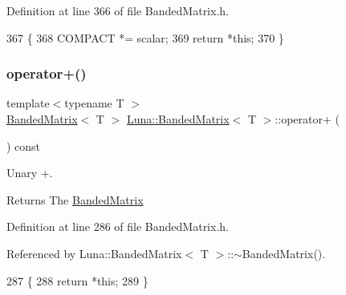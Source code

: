 Definition at line 366 of file Banded\+Matrix.\+h.


\begin{DoxyCode}
367   \{
368     COMPACT *= scalar;
369     \textcolor{keywordflow}{return} *\textcolor{keyword}{this};
370   \}
\end{DoxyCode}
\mbox{\label{classLuna_1_1BandedMatrix_a76611984fef082ce06e307fea390dc86}} 
\subsubsection{\texorpdfstring{operator+()}{operator+()}\hspace{0.1cm}{\footnotesize\ttfamily [1/2]}}
{\footnotesize\ttfamily template$<$typename T $>$ \\
\hyperlink{classLuna_1_1BandedMatrix}{Banded\+Matrix}$<$ T $>$ \hyperlink{classLuna_1_1BandedMatrix}{Luna\+::\+Banded\+Matrix}$<$ T $>$\+::operator+ (\begin{DoxyParamCaption}{ }\end{DoxyParamCaption}) const\hspace{0.3cm}{\ttfamily [inline]}}



Unary +. 

\begin{DoxyReturn}{Returns}
The \hyperlink{classLuna_1_1BandedMatrix}{Banded\+Matrix} 
\end{DoxyReturn}


Definition at line 286 of file Banded\+Matrix.\+h.



Referenced by Luna\+::\+Banded\+Matrix$<$ T $>$\+::$\sim$\+Banded\+Matrix().


\begin{DoxyCode}
287   \{
288     \textcolor{keywordflow}{return} *\textcolor{keyword}{this};
289   \}
\end{DoxyCode}
\mbox{\label{classLuna_1_1BandedMatrix_a56309b75d7eea8a11e47f0cae346fe5b}} 
